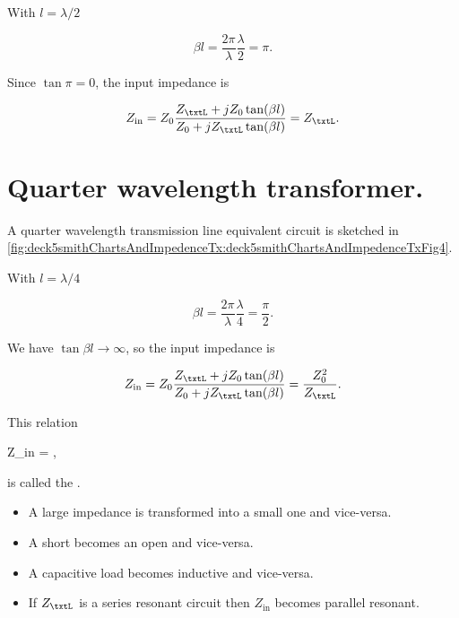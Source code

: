 With \( l = \lambda/2 \)

\begin{dmath}\label{eqn:uwavesDeck5SmithChartCore:180}
\beta l 
= \frac{2 \pi}{\lambda} \frac{\lambda}{2}
= \pi.
\end{dmath}

Since \( \tan \pi = 0 \), the input impedance is

\begin{dmath}\label{eqn:uwavesDeck5SmithChartCore:200}
Z_{\textrm{in}} 
= Z_0 \frac{ Z_\txtL + j Z_0 \tan(\beta l) }{ Z_0 + j Z_\txtL \tan(\beta l)}
= Z_\txtL.
\end{dmath}

\section{Quarter wavelength transformer.}

A quarter wavelength transmission line equivalent circuit is sketched in \cref{fig:deck5smithChartsAndImpedenceTx:deck5smithChartsAndImpedenceTxFig4}.


With \( l = \lambda/4 \)

\begin{dmath}\label{eqn:uwavesDeck5SmithChartCore:220}
\beta l 
= \frac{2 \pi}{\lambda} \frac{\lambda}{4}
= \frac{\pi}{2}.
\end{dmath}

We have \( \tan \beta l \rightarrow \infty \), so the input impedance is

\begin{dmath}\label{eqn:uwavesDeck5SmithChartCore:240}
Z_{\textrm{in}} 
= Z_0 \frac{ Z_\txtL + j Z_0 \tan(\beta l) }{ Z_0 + j Z_\txtL \tan(\beta l)}
= \frac{Z_0^2}{Z_\txtL}.
\end{dmath}

This relation

{
Z_{\textrm{in}} 
= ,
}

is called the .

\begin{itemize}
\item A large impedance is transformed into a small one and vice-versa.
\item A short becomes an open and vice-versa.
\item A capacitive load becomes inductive and vice-versa.
\item If \( Z_\txtL \) is a series resonant circuit then \( Z_{\textrm{in}} \) becomes parallel resonant.
\end{itemize}

